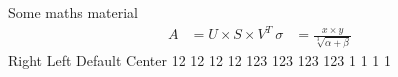 {}\markdownRendererUlBegin
\markdownRendererUlItem Some maths material\markdownRendererUlItemEnd 
\markdownRendererUlEnd \markdownRendererInterblockSeparator
{}\begin{align} A &= U \times S \times V^T\ \sigma &= \frac{x\times y}{\sqrt[3]{\alpha + \beta}} \end{align}\markdownRendererInterblockSeparator
{}\markdownRendererHorizontalRule{}\markdownRendererInterblockSeparator
{}\markdownRendererInterblockSeparator
{}%
{{Right}%
{Left}%
{Default}%
{Center}%
}%
{{12}%
{12}%
{12}%
{12}%
}%
{{123}%
{123}%
{123}%
{123}%
}%
{{1}%
{1}%
{1}%
{1}%
}%
\markdownRendererInterblockSeparator
{}\markdownRendererHorizontalRule{}\relax